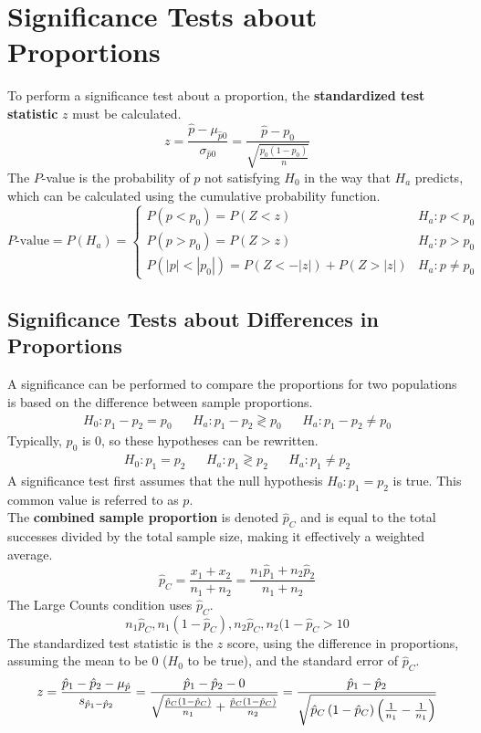 \documentclass[../AP_Statistics.tex]{subfiles}
\begin{document}
		\section{Significance Tests about Proportions}
			To perform a significance test about a proportion, the \textbf{standardized test statistic} $z$ must be calculated. \\
			$$z = \frac{\hat{p} - \mu_{\hat{p}0}}{\sigma_{\hat{p}0}} = \frac{\hat{p} - p_0}{\sqrt{\frac{p_0(1 - p_0)}{n}}}$$
			The $P$-value is the probability of $p$ not satisfying $H_0$ in the way that $H_a$ predicts, which can be calculated using the cumulative probability function.
			$$
				P\text{-value} = P(H_a) = \begin{cases}
 					P(p < p_0) = P(Z < z) & H_a:p < p_0 \\
 					P(p > p_0) = P(Z > z) & H_a:p > p_0 \\
 					P(|p| < |p_0|) = P(Z < -|z|) + P(Z > |z|) & H_a:p \ne p_0
				\end{cases}
			$$
			\subsection*{Significance Tests about Differences in Proportions}
				A significance can be performed to compare the proportions for two populations is based on the difference between sample proportions.
				\begin{align*}
					H_0:p_1 - p_2 = p_0 && H_a: p_1 - p_2 \gtrless p_0 && H_a:p_1 - p_2 \ne p_0
				\end{align*}
				Typically, $p_0$ is 0, so these hypotheses can be rewritten.
				\begin{align*}
					H_0:p_1 = p_2 && H_a:p_1 \gtrless p_2 && H_a:p_1 \ne p_2
				\end{align*}
				A significance test first assumes that the null hypothesis $H_0:p_1 = p_2$ is true. This common value is referred to as $p$. \\
				The \textbf{combined sample proportion} is denoted $\hat{p}_C$ and is equal to the total successes divided by the total sample size, making it effectively a weighted average.
				$$\hat{p}_C = \frac{x_1 + x_2}{n_1 + n_2} = \frac{n_1\hat{p}_1 + n_2\hat{p}_2}{n_1 + n_2}$$
				The Large Counts condition uses $\hat{p}_C$.
				$$n_1\hat{p}_C, n_1(1 - \hat{p}_C), n_2\hat{p}_C, n_2(1 - \hat{p}_C > 10$$
				The standardized test statistic is the $z$ score, using the difference in proportions, assuming the mean to be 0 ($H_0$ to be true), and the standard error of $\hat{p}_C$.
				$$z = \frac{\hat{p}_1 - \hat{p}_2 - \mu_{\hat{p}}}{s_{\hat{p}_1 - \hat{p}_2}} = \frac{\hat{p}_1 - \hat{p}_2 - 0}{\sqrt{\frac{\hat{p}_C\left(1 - \hat{p}_C\right)}{n_1} + \frac{\hat{p}_C\left(1 - \hat{p}_C\right)}{n_2}}} = \frac{\hat{p}_1 - \hat{p}_2}{\sqrt{\hat{p}_C\left(1 - \hat{p}_C\right)\left(\frac{1}{n_1} - \frac{1}{n_1}\right)}}$$
\end{document}
